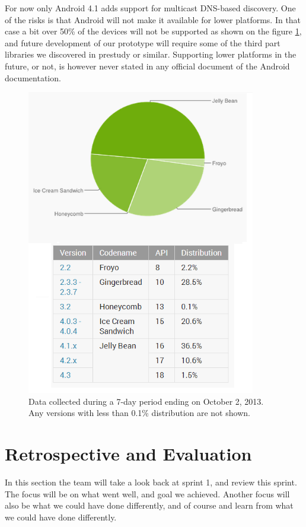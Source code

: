 For now only Android 4.1 adds support for multicast DNS-based discovery.
One of the risks is that Android will not make it available for lower platforms.
In that case a bit over 50\% of the devices will not be supported as shown on the figure \ref{fig:Platform_chart }, and future development of our prototype will require some of the third part libraries we discovered in prestudy or similar.
Supporting lower platforms in the future, or not, is however never stated in any official document of the Android documentation.

\begin{figure}[H]
	\centering
		\includegraphics[width=10cm]{sprint1/android_platform_chart.png}
	\caption{Data collected during a 7-day period ending on October 2, 2013. 
	Any versions with less than 0.1\% distribution are not shown.}
	\label{fig:Platform_chart }
\end{figure}

\section{Retrospective and Evaluation}
In this section the team will take a look back at sprint 1, and review this sprint. The focus will be on what went well, and goal we achieved. Another focus will also be what we could have done differently, and of course and learn from what we could have done differently.

